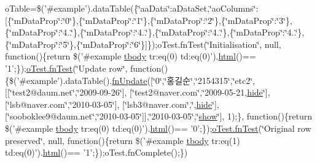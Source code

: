 \begin{DoxyCompactItemize}
o\+Table=\$('\#example').data\+Table(\{\char`\"{}aa\+Data\char`\"{}\+:a\+Data\+Set,\char`\"{}ao\+Columns\char`\"{}\+:\mbox{[}\{\char`\"{}m\+Data\+Prop\char`\"{}\+:\char`\"{}0\char`\"{}\},\{\char`\"{}m\+Data\+Prop\char`\"{}\+:\char`\"{}1\char`\"{}\},\{\char`\"{}m\+Data\+Prop\char`\"{}\+:\char`\"{}2\char`\"{}\},\{\char`\"{}m\+Data\+Prop\char`\"{}\+:\char`\"{}3\char`\"{}\},\{\char`\"{}m\+Data\+Prop\char`\"{}\+:\char`\"{}4..\char`\"{}\},\{\char`\"{}m\+Data\+Prop\char`\"{}\+:\char`\"{}4..\char`\"{}\},\{\char`\"{}m\+Data\+Prop\char`\"{}\+:\char`\"{}4..\char`\"{}\},\{\char`\"{}m\+Data\+Prop\char`\"{}\+:\char`\"{}4..\char`\"{}\},\{\char`\"{}m\+Data\+Prop\char`\"{}\+:\char`\"{}5\char`\"{}\},\{\char`\"{}m\+Data\+Prop\char`\"{}\+:\char`\"{}6\char`\"{}\}\mbox{]}\});o\+Test.\+fn\+Test(\char`\"{}Initialisation\char`\"{}, null, function()\{return \$('\#example \hyperlink{core_8constructor_8js_a99b0542c7c50fe8757c55bf9dac5f3be}{tbody} tr\+:eq(0) td\+:eq(0)').\hyperlink{tinymce_8jquery_8dev_8js_ac2090bcf2ff968c0083d5de53a6544f3}{html}()== '1';\});\hyperlink{__zero__config__objects__subarrays_8js_a7f100cfe8617a03cd30c47b5e15396a4}{o\+Test.\+fn\+Test}(\char`\"{}Update row\char`\"{}, function()\{\$('\#example').data\+Table().\hyperlink{api_8methods_8js_aa2d5cb6c218aa3c1618c97dc3c71a5a0}{fn\+Update}(\mbox{[}\char`\"{}0\char`\"{},\char`\"{}홍길순\char`\"{},\char`\"{}2154315\char`\"{},\char`\"{}etc2\char`\"{}, \mbox{[}\mbox{[}\char`\"{}test2@daum.\+net\char`\"{},\char`\"{}2009-\/09-\/26\char`\"{}\mbox{]}, \mbox{[}\char`\"{}test2@naver.\+com\char`\"{},\char`\"{}2009-\/05-\/21,\hyperlink{jquery_8tooltip_8js_af74dd80504a76d14389d6c8c02f3aa0e}{hide}\char`\"{}\mbox{]}, \mbox{[}\char`\"{}lsb@naver.\+com\char`\"{},\char`\"{}2010-\/03-\/05\char`\"{}\mbox{]}, \mbox{[}\char`\"{}lsb3@naver.\+com\char`\"{},\char`\"{},\hyperlink{jquery_8tooltip_8js_af74dd80504a76d14389d6c8c02f3aa0e}{hide}\char`\"{}\mbox{]}, \mbox{[}\char`\"{}sooboklee9@daum.\+net\char`\"{},\char`\"{}2010-\/03-\/05\char`\"{}\mbox{]}\mbox{]},\char`\"{}2010-\/03-\/05\char`\"{},\char`\"{}\hyperlink{jquery_8tooltip_8js_aa8d9f2083cafa2af98efafed94901079}{show}\char`\"{}\mbox{]}, 1);\}, function()\{return \$('\#example \hyperlink{core_8constructor_8js_a99b0542c7c50fe8757c55bf9dac5f3be}{tbody} tr\+:eq(0) td\+:eq(0)').\hyperlink{tinymce_8jquery_8dev_8js_ac2090bcf2ff968c0083d5de53a6544f3}{html}()== '0';\});\hyperlink{__zero__config__objects__subarrays_8js_a7f100cfe8617a03cd30c47b5e15396a4}{o\+Test.\+fn\+Test}(\char`\"{}Original row preserved\char`\"{}, null, function()\{return \$('\#example \hyperlink{core_8constructor_8js_a99b0542c7c50fe8757c55bf9dac5f3be}{tbody} tr\+:eq(1) td\+:eq(0)').\hyperlink{tinymce_8jquery_8dev_8js_ac2090bcf2ff968c0083d5de53a6544f3}{html}()== '1';\});o\+Test.\+fn\+Complete();\})
\end{DoxyCompactItemize}


